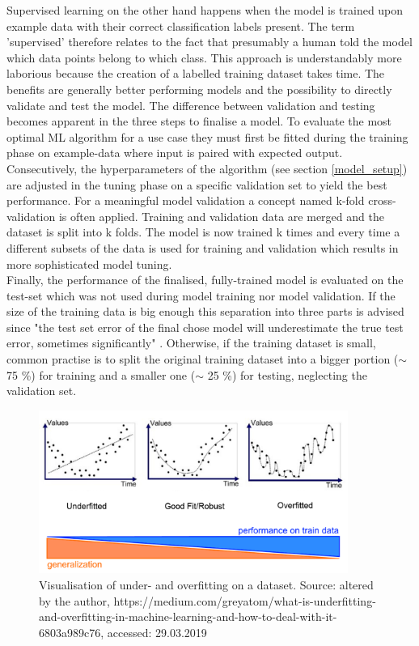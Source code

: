 Supervised learning on the other hand happens when the model is trained upon example data with their correct classification labels present. The term 'supervised' therefore relates to the fact that presumably a human told the model which data points belong to which class. This approach is understandably more laborious because the creation of a labelled training dataset takes time. The benefits are generally better performing models and the possibility to directly validate and test the model. The difference between validation and testing becomes apparent in the three steps to finalise a model. To evaluate the most optimal ML algorithm for a use case they must first be fitted during the training phase on example-data where input is paired with expected output. Consecutively, the hyperparameters of the algorithm (see section \ref{model_setup}) are adjusted in the tuning phase on a specific validation set to yield the best performance. For a meaningful model validation a concept named k-fold cross-validation is often applied. Training and validation data are merged and the dataset is split into k folds. The model is now trained k times and every time a different subsets of the data is used for training and validation which results in more sophisticated model tuning. \\
Finally, the performance of the finalised, fully-trained model is evaluated on the test-set which was not used during model training nor model validation. If the size of the training data is big enough this separation into three parts is advised since "the test set error of the final chose model will underestimate the true test error, sometimes significantly" \parencite[p.222]{Hastie2017}. Otherwise, if the training dataset is small, common practise \parencite{Guido2016} is to split the original training dataset into a bigger portion ($\sim$ 75 \%) for training and a smaller one ($\sim$ 25 \%) for testing, neglecting the validation set.

\begin{figure}[!htb]
   \centering
   \includegraphics[width=0.9\textwidth]{img/over_underfitting}
   \caption{Visualisation of under- and overfitting on a dataset. Source: altered by the author, https://medium.com/greyatom/what-is-underfitting-and-overfitting-in-machine-learning-and-how-to-deal-with-it-6803a989c76, accessed: 29.03.2019}
   \label{fig:over_underfitting}
\end{figure}

